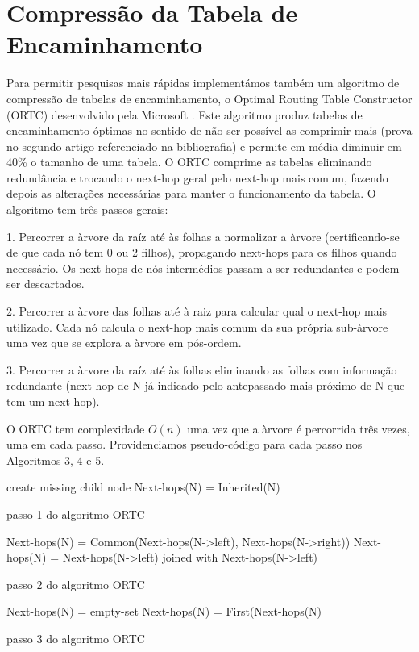 \documentclass[10pt,a4paper]{article}
\begin{document}
\section{Compressão da Tabela de Encaminhamento}
	Para permitir pesquisas mais rápidas implementámos também um algoritmo de compressão de tabelas de encaminhamento, o Optimal Routing Table Constructor (ORTC) desenvolvido pela Microsoft \cite{DravesKSZ99}. Este algoritmo produz tabelas de encaminhamento óptimas no sentido de não ser possível as comprimir mais (prova no segundo artigo referenciado na bibliografia) e permite em média diminuir em 40\% o tamanho de uma tabela.
	O ORTC comprime as tabelas eliminando redundância e trocando o next-hop geral pelo next-hop mais comum, fazendo depois as alterações necessárias para manter o funcionamento da tabela. O algoritmo tem três passos gerais: 
	
	1. Percorrer a àrvore da raíz até às folhas a normalizar a àrvore (certificando-se de que cada nó tem 0 ou 2 filhos), propagando next-hops para os filhos quando necessário. Os next-hops de nós intermédios passam a ser redundantes e podem ser descartados.   
	
	2. Percorrer a àrvore das folhas até à raiz para calcular qual o next-hop mais utilizado. Cada nó calcula o next-hop mais comum da sua própria sub-àrvore uma vez que se explora a àrvore em pós-ordem.
	
	3. Percorrer a àrvore da raíz até às folhas eliminando as folhas com informação redundante (next-hop de N já indicado pelo antepassado mais próximo de N que tem um next-hop).
	
	O ORTC tem complexidade $O(n)$ uma vez que a àrvore é percorrida três vezes, uma em cada passo. Providenciamos pseudo-código para cada passo nos Algoritmos 3, 4 e 5.
	
\begin{algorithm}
\label{algo:ORTC_step1}
{
	{
		create missing child node
	}
	{
		Next-hops(N) = Inherited(N)	
	}
}
\caption{passo 1 do algoritmo ORTC}
\end{algorithm}

\begin{algorithm}
\label{algo:ORTC_step2}
{
	{
		Next-hops(N) = Common(Next-hops(N->left), Next-hops(N->right))
	}
	\uElse
	{
		Next-hops(N) = Next-hops(N->left) joined with Next-hops(N->left) 	
	}
}
\caption{passo 2 do algoritmo ORTC}
\end{algorithm}


\begin{algorithm}
\label{algo:ORTC_step3}
{
	{
		Next-hops(N) = empty-set
	}
	\uElse
	{
		Next-hops(N) = First(Next-hops(N)	
	}
}
\caption{passo 3 do algoritmo ORTC}
\end{algorithm}


\end{document}
